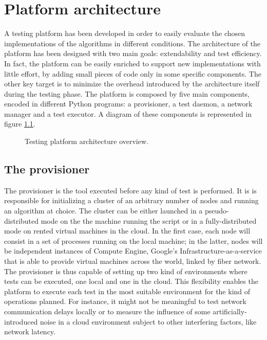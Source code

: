 \chapter{Platform architecture}\label{chp:platform_arch}

A testing platform has been developed in order to easily evaluate the chosen implementations of the algorithms in different conditions. The architecture of the platform has been designed with two main goals: extendability and test efficiency. In fact, the platform can be easily enriched to support new implementations with little effort, by adding small pieces of code only in some specific components. The other key target is to minimize the overhead introduced by the architecture itself during the testing phase.
The platform is composed by five main components, encoded in different Python programs: a provisioner, a test daemon, a network manager and a test executor. A diagram of these components is represented in figure \ref{testing}.

\begin{figure}[H]
  \caption{Testing platform architecture overview.}
  \label{testing}
\end{figure}

\section{The provisioner}
The provisioner is the tool executed before any kind of test is performed. It is is responsible for initializing a cluster of an arbitrary number of nodes and running an algorithm at choice. The cluster can be either launched in a pseudo-distributed mode on the the machine running the script or in a fully-distributed mode on rented virtual machines in the cloud. In the first case, each node will consist in a set of processes running on the local machine; in the latter, nodes will be independent instances of Compute Engine, Google’s Infrastructure-as-a-service that is able to provide virtual machines across the world, linked by fiber network. The provisioner is thus capable of setting up two kind of environments where tests can be executed, one local and one in the cloud. This flexibility enables the platform to execute each test in the most suitable environment for the kind of operations planned. For instance, it might not be meaningful to test network communication delays locally or to measure the influence of some artificially-introduced noise in a cloud environment subject to other interfering factors, like network latency.

